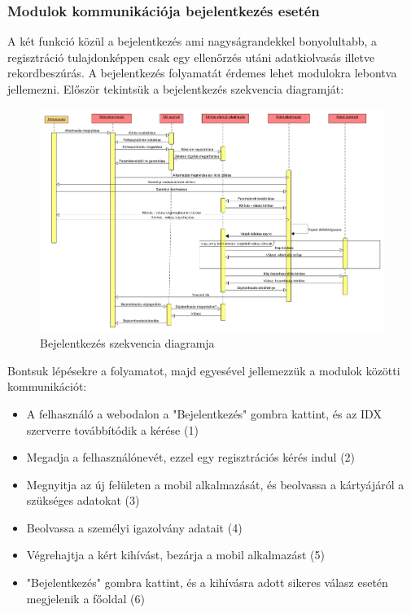 \subsubsection{Modulok kommunikációja bejelentkezés esetén}
A két funkció közül a bejelentkezés ami nagyságrandekkel bonyolultabb, a regisztráció tulajdonképpen csak egy ellenőrzés utáni adatkiolvasás illetve rekordbeszúrás. A bejelentkezés folyamatát érdemes lehet modulokra lebontva jellemezni.
Először tekintsük a bejelentkezés szekvencia diagramját:

\begin{figure}
\centering
         \includegraphics[scale=0.47]{img/szekvencia}
    \caption{Bejelentkezés szekvencia diagramja}
\end{figure}


\newpage
Bontsuk lépésekre a folyamatot, majd egyesével jellemezzük a modulok közötti kommunikációt:
\begin{itemize}
\item A felhasználó a webodalon a "Bejelentkezés" gombra kattint, és az IDX szerverre továbbítódik a kérése (1)
\item Megadja a felhasználónevét, ezzel egy regisztrációs kérés indul (2)
\item Megnyitja az új felületen a mobil alkalmazását, és beolvassa a kártyájáról a szükséges adatokat (3)
\item Beolvassa a személyi igazolvány adatait (4)
\item Végrehajtja a kért kihívást, bezárja a mobil alkalmazást  (5)
\item "Bejelentkezés" gombra kattint, és a kihívásra adott sikeres válasz esetén megjelenik a főoldal (6)
\end{itemize}


